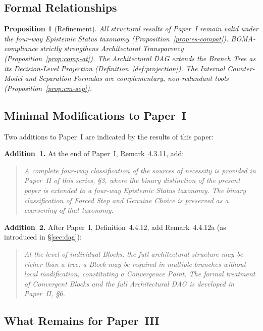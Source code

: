 \documentclass[12pt, a4paper]{article}
\theoremstyle{plain}
\newtheorem{proposition}[theorem]{Proposition}
\theoremstyle{definition}
\theoremstyle{remark}
\newcommand{\BOMA}{\textsf{BOMA}}
\begin{document}
\subsection{Formal Relationships}
\label{subsec:rel-formal}

\begin{proposition}[Refinement]
\label{prop:refinement}
All structural results of Paper~I remain valid under the four-way
Epistemic Status taxonomy (Proposition~\ref{prop:es-compat}).
\BOMA{}-compliance strictly strengthens Architectural Transparency
(Proposition~\ref{prop:comp-at}). The Architectural DAG extends the
Branch Tree as its Decision-Level Projection
(Definition~\ref{def:projection}). The Internal Counter-Model and
Separation Formulas are complementary, non-redundant tools
(Proposition~\ref{prop:cm-sep}).
\end{proposition}

\subsection{Minimal Modifications to Paper~I}
\label{subsec:rel-mods}

Two additions to Paper~I are indicated by the results of this paper:

\textbf{Addition~1.} At the end of Paper~I, Remark~4.3.11, add:
\begin{quote}
\textit{A complete four-way classification of the sources of necessity
is provided in Paper~II of this series, \S3, where the binary
distinction of the present paper is extended to a four-way Epistemic
Status taxonomy. The binary classification of Forced Step and Genuine
Choice is preserved as a coarsening of that taxonomy.}
\end{quote}

\textbf{Addition~2.} After Paper~I, Definition~4.4.12, add
Remark~4.4.12a (as introduced in \S\ref{sec:dag}):
\begin{quote}
\textit{At the level of individual Blocks, the full architectural
structure may be richer than a tree: a Block may be required in
multiple branches without local modification, constituting a
Convergence Point. The formal treatment of Convergent Blocks and the
full Architectural DAG is developed in Paper~II, \S6.}
\end{quote}

\subsection{What Remains for Paper~III}
\label{subsec:rel-paper3}
\end{document}
